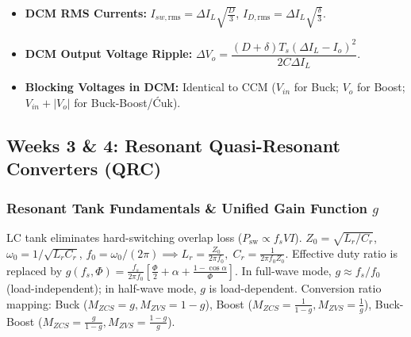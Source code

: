 \vspace{-4pt}
\begin{itemize}\setlength{\itemsep}{1pt}\setlength{\parskip}{0pt}
  \item \textbf{DCM RMS Currents:} $I_{sw,\mathrm{rms}} = \Delta I_L \sqrt{\tfrac{D}{3}}$, \quad $I_{D,\mathrm{rms}} = \Delta I_L \sqrt{\tfrac{\delta}{3}}$.
  \item \textbf{DCM Output Voltage Ripple:} $\Delta V_o = \dfrac{(D + \delta) T_s (\Delta I_L - I_o)^2}{2 C \Delta I_L}$.
  \item \textbf{Blocking Voltages in DCM:} Identical to CCM ($V_{in}$ for Buck; $V_o$ for Boost; $V_{in}+|V_o|$ for Buck-Boost/\'{C}uk).
\end{itemize}

\vspace{-6pt}
\subsection{Weeks 3 \& 4: Resonant Quasi-Resonant Converters (QRC)}
\vspace{-4pt}

\subsubsection*{Resonant Tank Fundamentals \& Unified Gain Function $g$}
\vspace{-4pt}
LC tank eliminates hard-switching overlap loss ($P_{\mathrm{sw}} \propto f_s V I$).
$Z_0 = \sqrt{L_r/C_r}$, $\omega_0 = 1/\sqrt{L_r C_r}$, $f_0 = \omega_0/(2\pi) \implies L_r = \frac{Z_0}{2\pi f_0}, \; C_r = \frac{1}{2\pi f_0 Z_0}$.
Effective duty ratio is replaced by $g(f_s, \Phi) = \frac{f_s}{2\pi f_0} \left[ \frac{\Phi}{2} + \alpha + \frac{1-\cos\alpha}{\Phi} \right]$.
In full-wave mode, $g \approx f_s/f_0$ (load-independent); in half-wave mode, $g$ is load-dependent.
Conversion ratio mapping: Buck ($M_{ZCS}=g, M_{ZVS}=1-g$), Boost ($M_{ZCS}=\frac{1}{1-g}, M_{ZVS}=\frac{1}{g}$), Buck-Boost ($M_{ZCS}=\frac{g}{1-g}, M_{ZVS}=\frac{1-g}{g}$).

\vspace{-6pt}
